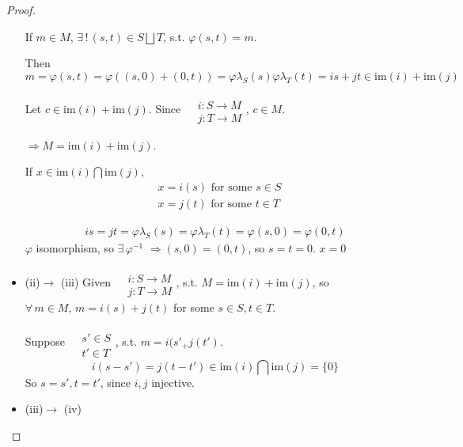 \documentclass[10pt]{amsart}
\begin{document}
\begin{multicols*}{2}
\begin{proof}
\begin{itemize}
If $m\in M$, $\exists \, ! \, (s,t) \in S\bigsqcup T$, s.t. $\varphi(s,t)=m$.  

Then 
\[
m = \varphi(s,t) = \varphi((s,0) + (0,t)) = \varphi\lambda_S(s)  \varphi \lambda_T(t) = is + jt \in \text{im}(i) + \text{im}(j)
\]

Let $c\in \text{im}(i) + \text{im}(j)$.  Since $\begin{aligned}  & \quad \\ 
	& i : S\to M \\
& j : T \to M \end{aligned}$, $c\in M$.  

$\Longrightarrow M = \text{im}(i) + \text{im}(j)$.  



If $x\in \text{im}(i) \bigcap \text{im}(j)$, 
\[
\begin{aligned}
	& x = i(s) \text{ for some } s\in S \\ 
		& x = j(t) \text{ for some } t\in T  
\end{aligned}
\]

\[
\begin{gathered}
	is=jt = \varphi \lambda_S(s) = \varphi \lambda_T(t) = \varphi(s,0) = \varphi(0,t) 
\end{gathered}
\]
$\varphi$ isomorphism, so $\exists \, \varphi^{-1}$ $\Longrightarrow (s,0) = (0,t)$, so $s=t=0$.  $x=0$  
\item (ii)$\to $ (iii) Given $\begin{aligned} & \quad \\ & i:S\to M \\ & j:T\to M \end{aligned}$, s.t. $M= \text{im}(i) + \text{im}(j)$, so \\

$\forall \, m \in M$, $m=i(s) + j(t)$ for some $s\in S,t\in T$.  

Suppose $\begin{aligned} & \quad \\ 
	& s' \in S \\
& t' \in T \end{aligned}$, s.t. $m=i(s'_ + j(t')$.  
\[
i(s-s') = j(t-t') \in \text{im}(i) \bigcap \text{im}(j) = \lbrace 0 \rbrace
\]
So $s=s',t=t'$, since $i,j$ injective.  
\item (iii)$\to$ (iv)   


\end{itemize}
\end{proof}
\end{multicols*}
\end{document}

